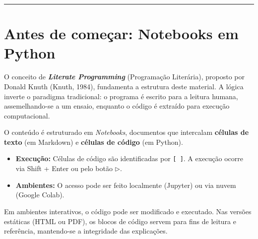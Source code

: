 \documentclass[
  portuguese,
  letterpaper,
  openany,
  oneside,
  12pt,
  a4paper]{book}
\providecommand{\tightlist}{%
  \setlength{\itemsep}{0pt}\setlength{\parskip}{0pt}}
\begin{document}
\begin{center}\rule{0.5\linewidth}{0.5pt}\end{center}

\section*{Antes de começar: Notebooks em
Python}\label{antes-de-comeuxe7ar-notebooks-em-python}


O conceito de \textbf{\emph{Literate Programming}} (Programação
Literária), proposto por Donald Knuth (Knuth, 1984), fundamenta a
estrutura deste material. A lógica inverte o paradigma tradicional: o
programa é escrito para a leitura humana, assemelhando-se a um ensaio,
enquanto o código é extraído para execução computacional.

O conteúdo é estruturado em \emph{Notebooks}, documentos que intercalam
\textbf{células de texto} (em Markdown) e \textbf{células de código} (em
Python).

\begin{itemize}
\tightlist
\item
  \textbf{Execução:} Células de código são identificadas por
  \texttt{{[}\ {]}}. A execução ocorre via Shift + Enter ou pelo botão
  $\triangleright$.
\item
  \textbf{Ambientes:} O acesso pode ser feito localmente (Jupyter) ou
  via nuvem (Google Colab).
\end{itemize}

\begin{tcolorbox}[enhanced jigsaw, coltitle=black, colback=white, colbacktitle=quarto-callout-tip-color!10!white, bottomtitle=1mm, left=2mm, opacityback=0, breakable, rightrule=.15mm, titlerule=0mm, toptitle=1mm, opacitybacktitle=0.6, title=\textcolor{quarto-callout-tip-color}{\faLightbulb}\hspace{0.5em}{Nota sobre o formato}, colframe=quarto-callout-tip-color-frame, arc=.35mm, bottomrule=.15mm, toprule=.15mm, leftrule=.75mm]

Em ambientes interativos, o código pode ser modificado e executado. Nas
versões estáticas (HTML ou PDF), os blocos de código servem para fins de
leitura e referência, mantendo-se a integridade das explicações.

\end{tcolorbox}
\end{document}
